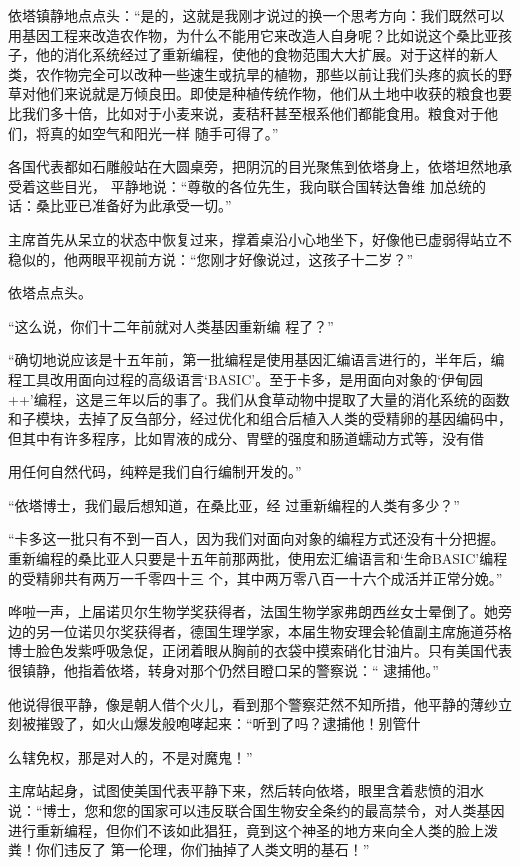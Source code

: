 \documentclass{article}
\begin{document}
依塔镇静地点点头：“是的，这就是我刚才说过的换一个思考方向：我们既然可以用基因工程来改造农作物，为什么不能用它来改造人自身呢？比如说这个桑比亚孩子，他的消化系统经过了重新编程，使他的食物范围大大扩展。对于这样的新人类，农作物完全可以改种一些速生或抗旱的植物，那些以前让我们头疼的疯长的野草对他们来说就是万倾良田。即使是种植传统作物，他们从土地中收获的粮食也要比我们多十倍，比如对于小麦来说，麦秸秆甚至根系他们都能食用。粮食对于他们，将真的如空气和阳光一样
随手可得了。” 

各国代表都如石雕般站在大圆桌旁，把阴沉的目光聚焦到依塔身上，依塔坦然地承受着这些目光，
\newpage
平静地说：“尊敬的各位先生，我向联合国转达鲁维
加总统的话：桑比亚已准备好为此承受一切。” 

主席首先从呆立的状态中恢复过来，撑着桌沿小心地坐下，好像他已虚弱得站立不稳似的，他两眼平视前方说：“您刚才好像说过，这孩子十二岁？”


依塔点点头。 

“这么说，你们十二年前就对人类基因重新编
程了？” 

“确切地说应该是十五年前，第一批编程是使用基因汇编语言进行的，半年后，编程工具改用面向过程的高级语言‘BASIC’。至于卡多，是用面向对象的‘伊甸园++’编程，这是三年以后的事了。我们从食草动物中提取了大量的消化系统的函数和子模块，去掉了反刍部分，经过优化和组合后植入人类的受精卵的基因编码中，但其中有许多程序，比如胃液的成分、胃壁的强度和肠道蠕动方式等，没有借

\newpage
用任何自然代码，纯粹是我们自行编制开发的。” 

“依塔博士，我们最后想知道，在桑比亚，经
过重新编程的人类有多少？” 

“卡多这一批只有不到一百人，因为我们对面向对象的编程方式还没有十分把握。重新编程的桑比亚人只要是十五年前那两批，使用宏汇编语言和‘生命BASIC’编程的受精卵共有两万一千零四十三
个，其中两万零八百一十六个成活并正常分娩。” 

哗啦一声，上届诺贝尔生物学奖获得者，法国生物学家弗朗西丝女士晕倒了。她旁边的另一位诺贝尔奖获得者，德国生理学家，本届生物安理会轮值副主席施道芬格博士脸色发紫呼吸急促，正闭着眼从胸前的衣袋中摸索硝化甘油片。只有美国代表很镇静，他指着依塔，转身对那个仍然目瞪口呆的警察说：“
逮捕他。” 

他说得很平静，像是朝人借个火儿，看到那个警察茫然不知所措，他平静的薄纱立刻被摧毁了，如火山爆发般咆哮起来：“听到了吗？逮捕他！别管什
\newpage

么辖免权，那是对人的，不是对魔鬼！” 

主席站起身，试图使美国代表平静下来，然后转向依塔，眼里含着悲愤的泪水说：“博士，您和您的国家可以违反联合国生物安全条约的最高禁令，对人类基因进行重新编程，但你们不该如此猖狂，竟到这个神圣的地方来向全人类的脸上泼粪！你们违反了
第一伦理，你们抽掉了人类文明的基石！” 
\end{document}
